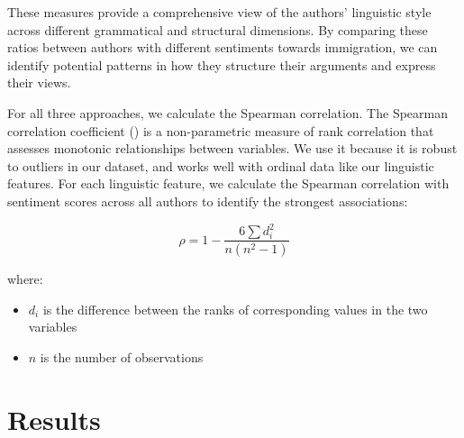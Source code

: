 \documentclass[11pt]{article}
\begin{document}
These measures provide a comprehensive view of the authors' linguistic style across different grammatical and structural dimensions.
By comparing these ratios between authors with different sentiments towards immigration, we can identify potential patterns in how they structure their arguments and express their views.

For all three approaches, we calculate the Spearman correlation.
The Spearman correlation coefficient (\rho) is a non-parametric measure of rank correlation that assesses monotonic relationships between variables.
We use it because it is robust to outliers in our dataset, and works well with ordinal data like our linguistic features.
For each linguistic feature, we calculate the Spearman correlation with sentiment scores across all authors to identify the strongest associations:

\begin{equation}
        \rho = 1 - \frac{6\sum d_i^2}{n(n^2-1)}
\end{equation}

where:
\begin{itemize}
        \item $d_i$ is the difference between the ranks of corresponding values in the two variables
        \item $n$ is the number of observations
\end{itemize}

\section{Results}
\end{document}
